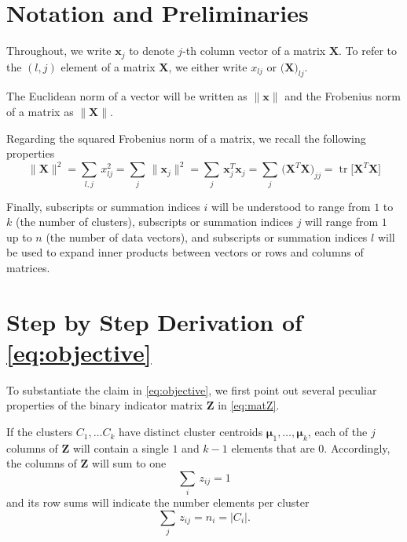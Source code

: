 \documentclass[fleqn]{llncs}
\newcommand{\mat}[1]{\boldsymbol{{#1}}}
\renewcommand{\vec}[1]{\boldsymbol{{#1}}}
\newcommand{\nrm}[1]{\bigl \lVert #1 \bigr \rVert^2}
\newcommand{\tr}[1]{\operatorname{tr} \bigl [ #1 \bigr ]}
\begin{document}
\section{Notation and Preliminaries}

Throughout, we write $\vec{x}_j$ to denote $j$-th column vector of a matrix $\mat{X}$. To refer to the $(l,j)$ element of a matrix $\mat{X}$, we either write $x_{lj}$ or $\bigl( \mat{X} \bigr)_{lj}$.

The Euclidean norm of a vector will be written as $\lVert \vec{x} \rVert$ and the Frobenius norm of a matrix as $\lVert \mat{X} \rVert$.

Regarding the squared Frobenius norm of a matrix, we recall the following properties
\begin{equation}
\label{eq:norm}
\nrm{\mat{X}} = \sum_{l, j} \, x_{lj}^2 = \sum_j \, \nrm{\vec{x}_j} = \sum_j \, \vec{x}_j^T \vec{x}_j
= \sum_j \, \bigl( \mat{X}^T \mat{X} \bigr)_{jj} = \tr{\mat{X}^T \mat{X}}
\end{equation}

Finally, subscripts or summation indices $i$ will be understood to range from $1$ to $k$ (the number of clusters), subscripts or summation indices $j$ will range from $1$ up to $n$ (the number of data vectors), and subscripts or summation indices $l$ will be used to expand inner products between vectors or rows and columns of matrices.




\section{Step by Step Derivation of \eqref{eq:objective}}

To substantiate the claim in \eqref{eq:objective}, we first point out several peculiar properties of the binary indicator matrix $\mat{Z}$ in \eqref{eq:matZ}.

If the clusters $C_1, \ldots C_k$ have distinct cluster centroids $\vec{\mu}_1, \ldots, \vec{\mu}_k$, each of the $j$ columns of $\mat{Z}$ will contain a single $1$ and $k-1$ elements that are $0$. Accordingly, the columns of $\mat{Z}$ will sum to one
\begin{equation}
\label{eq:colsum}
\sum_i \, z_{ij} = 1
\end{equation}
and its row sums will indicate the number elements per cluster
\begin{equation}
\label{eq:rowsum}
\sum_j \, z_{ij} = n_i = \lvert C_i \rvert.
\end{equation}
\end{document}
